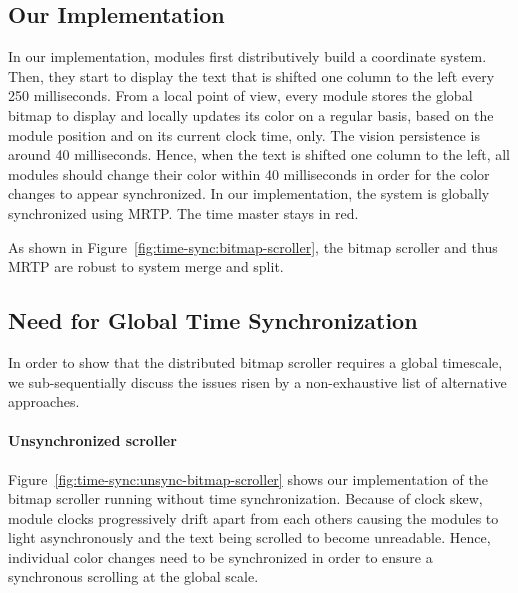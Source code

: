 \subsection{Our Implementation}

In our implementation, modules first distributively build a coordinate system. Then, they start to display the text that is shifted one column to the left every 250 milliseconds. From a local point of view, every module stores the global bitmap to display and locally updates its color on a regular basis, based on the module position and on its current clock time, only. The vision persistence is around 40 milliseconds. Hence, when the text is shifted one column to the left, all modules should change their color within 40 milliseconds in order for the color changes to appear synchronized. In our implementation, the system is globally synchronized using MRTP. The time master stays in red.

As shown in Figure~\ref{fig:time-sync:bitmap-scroller}, the bitmap scroller and thus MRTP are robust to system merge and split.

\subsection{Need for Global Time Synchronization}

In order to show that the distributed bitmap scroller requires a global timescale, we sub-sequentially discuss the issues risen by a non-exhaustive list of alternative approaches.

\paragraph{Unsynchronized scroller}

Figure~\ref{fig:time-sync:unsync-bitmap-scroller} shows our implementation of the bitmap scroller running without time synchronization. Because of clock skew, module clocks progressively drift apart from each others causing the modules to light asynchronously and the text being scrolled to become unreadable. Hence, individual color changes need to be synchronized in order to ensure a synchronous scrolling at the global scale.


